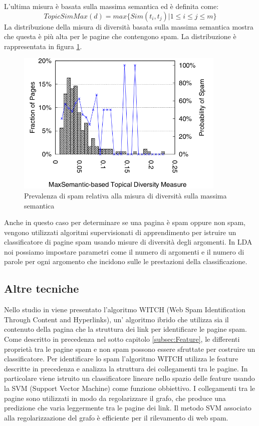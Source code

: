 L'ultima misura è basata sulla massima semantica ed è definita come:
\begin{equation}
TopicSimMax(d)= max\{Sim(t_i,t_j)|1 \leq i \leq j \leq m \}
\end{equation}
La distribuzione della misura di diversità basata sulla massima semantica mostra che questa è più alta per le pagine che contengono spam. La distribuzione è rappresentata in figura \ref{fig:zhou4}.
\begin{figure}	
\centering
\includegraphics[width=10cm]{immagini/zhou/immagine4}
\caption{Prevalenza di spam relativa alla misura di diversità sulla massima semantica}
\label{fig:zhou4}
\end{figure}

Anche in questo caso per determinare se una pagina è spam oppure non spam, vengono utilizzati algoritmi supervisionati di apprendimento per istruire un classificatore di pagine spam usando misure di diversità degli argomenti. In LDA noi possiamo impostare parametri come il numero di argomenti e il numero di parole per ogni argomento che incidono sulle le prestazioni della classificazione.

\subsection{Altre tecniche}
Nello studio in \cite{Abernethy:2008:WSI:1451983.1451994} viene presentato  l'algoritmo WITCH (Web Spam Identification Through Content and Hyperlinks), un' algoritmo ibrido che utilizza sia il contenuto della pagina che la struttura dei link per identificare le pagine spam. Come descritto in precedenza nel sotto capitolo \ref{subsec:Feature}, le differenti proprietà tra le pagine spam e non spam possono essere sfruttate per costruire un classificatore. Per identificare lo spam l'algoritmo WITCH  utilizza le feature descritte in precedenza e analizza la struttura dei collegamenti tra le pagine. In particolare viene istruito un classificatore lineare nello spazio delle feature usando la SVM (Support Vector Machine) come funzione obbiettivo. I collegamenti tra le pagine sono utilizzati in modo da regolarizzare il grafo, che produce una predizione che varia leggermente tra le pagine dei link. Il metodo SVM associato alla regolarizzazione del grafo è efficiente per il rilevamento di web spam. 


